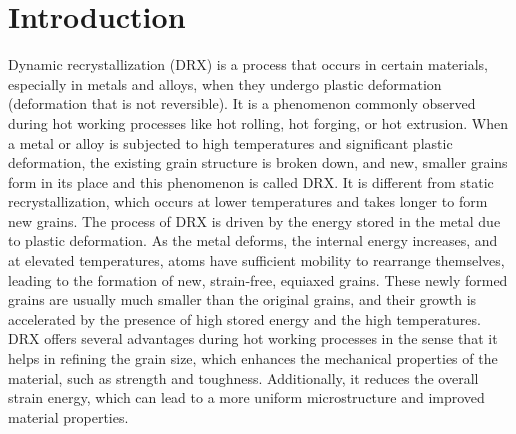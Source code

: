 \documentclass[metals,article,submit,pdftex,moreauthors]{Definitions/mdpi}
\begin{document}
\section{Introduction\label{sec:Introduction}}
Dynamic recrystallization (DRX) is a process that occurs in certain materials, especially in metals and alloys, when they undergo plastic deformation (deformation that is not reversible). It is a phenomenon commonly observed during hot working processes like hot rolling, hot forging, or hot extrusion. When a metal or alloy is subjected to high temperatures and significant plastic deformation, the existing grain structure is broken down, and new, smaller grains form in its place and this phenomenon is called DRX. It is different from static recrystallization, which occurs at lower temperatures and takes longer to form new grains. The process of DRX is driven by the energy stored in the metal due to plastic deformation. As the metal deforms, the internal energy increases, and at elevated temperatures, atoms have sufficient mobility to rearrange themselves, leading to the formation of new, strain-free, equiaxed grains. These newly formed grains are usually much smaller than the original grains, and their growth is accelerated by the presence of high stored energy and the high temperatures. DRX offers several advantages during hot working processes in the sense that it helps in refining the grain size, which enhances the mechanical properties of the material, such as strength and toughness. Additionally, it reduces the overall strain energy, which can lead to a more uniform microstructure and improved material properties. 
\end{document}
